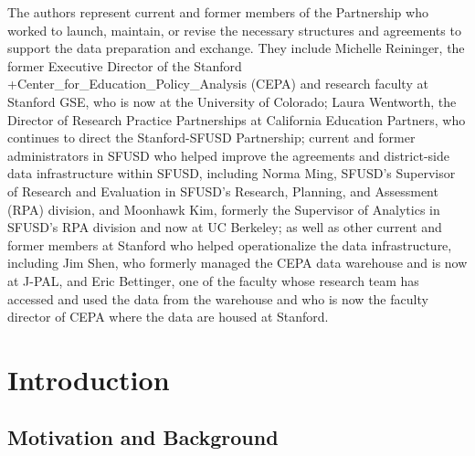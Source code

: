 \documentclass[
]{book}
\begin{document}
The authors represent current and former members of the Partnership who worked to launch, maintain, or revise the necessary structures and agreements to support the data preparation and exchange. They include Michelle Reininger, the former Executive Director of the Stanford +Center\_for\_Education\_Policy\_Analysis\textbar{} (CEPA) and research faculty at Stanford GSE, who is now at the University of Colorado; Laura Wentworth, the Director of Research Practice Partnerships at California Education Partners, who continues to direct the Stanford-SFUSD Partnership; current and former administrators in SFUSD who helped improve the agreements and district-side data infrastructure within SFUSD, including Norma Ming, SFUSD's Supervisor of Research and Evaluation in SFUSD's Research, Planning, and Assessment (RPA) division, and Moonhawk Kim, formerly the Supervisor of Analytics in SFUSD's RPA division and now at UC Berkeley; as well as other current and former members at Stanford who helped operationalize the data infrastructure, including Jim Shen, who formerly managed the CEPA data warehouse and is now at J-PAL, and Eric Bettinger, one of the faculty whose research team has accessed and used the data from the warehouse and who is now the faculty director of CEPA where the data are housed at Stanford.

\hypertarget{introduction-6}{%
\section{Introduction}\label{introduction-6}}

\hypertarget{motivation-and-background-5}{%
\subsection{Motivation and Background}\label{motivation-and-background-5}}
\end{document}
